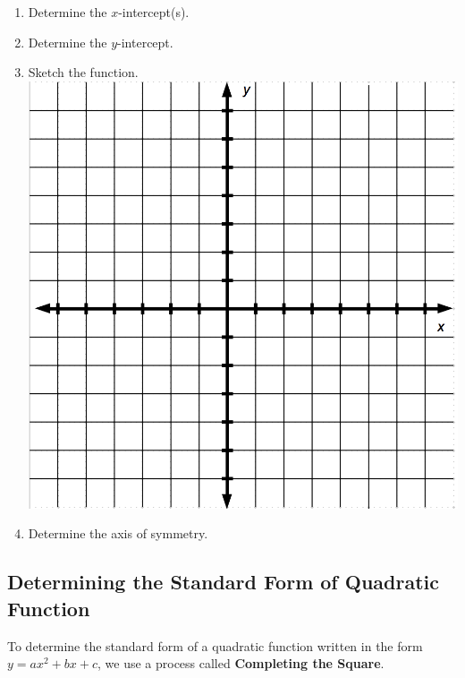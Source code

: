 \begin{enumerate}
\begin{enumerate}
\item Determine the $x$-intercept(s).\\[1in]
\item Determine the $y$-intercept.\\[.5in]
\item Sketch the function.\\
\includegraphics[scale=.5]{bigaxes}\\
\item Determine the axis of symmetry.\\



\end{enumerate}






\newpage



\subsection{Determining the Standard Form of Quadratic Function}

\noindent To determine the standard form of a quadratic function written in the form $y=ax^2+bx+c$, we use a process called \textbf{Completing the Square}.



\end{enumerate}
